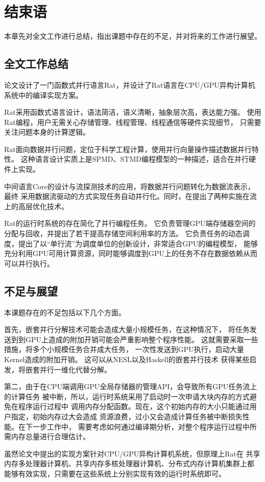 \chapter{结束语}
本章先对全文工作进行总结，指出课题中存在的不足，并对将来的工作进行展望。

\section{全文工作总结}
论文设计了一门函数式并行语言Rat，并设计了Rat语言在CPU/GPU异构计算机系统中的编译实现方案。

Rat采用函数式语言设计，语法简洁，语义清晰，抽象层次高，表达能力强。
使用Rat编程，用户无需关心存储管理、线程管理、线程通信等硬件实现细节，
只需要关注问题本身的计算逻辑。

Rat面向数据并行问题，定位于科学工程计算，使用并行向量操作描述数据并行特性。
这种语言设计实质上是SPMD、STMD编程模型的一种描述，适合在并行硬件上实现。

中间语言Core的设计与流探测技术的应用，将数据并行问题转化为数据流表示，最终
采用数据流驱动的方式实现任务自动并行化。同时，在提出了两种实施在流上的高层优化技术。

Rat的运行时系统的存在简化了并行编程任务。
它负责管理GPU端存储器空间的分配与回收，并提出了若干提高存储空间利用率的方法。
它负责任务的动态调度，提出了以“单行流”为调度单位的创新设计，非常适合GPU的编程模型，
能够充分利用GPU可用计算资源，同时能够调度到GPU上的任务不存在数据依赖从而可以并行执行。

\section{不足与展望}
本课题存在的不足包括以下几个方面。

首先，嵌套并行分解技术可能会造成大量小规模任务，在这种情况下，
将任务发送到到GPU上造成的附加开销可能会严重影响整个程序性能。
这就需要采取一些措施，将多个小规模任务合并成大任务，
一次性发送到GPU执行，启动大量Kernel造成的附加开销。
这可以从NESL以及Haskell的嵌套并行技术
获得某些启发，将嵌套并行一维化代替分解。

第二，由于在CPU端调用GPU全局存储器的管理API，会导致所有GPU任务流上的计算任务
被中断，所以，运行时系统采用了启动时一次申请大块内存的方式避免在程序运行过程中
调用内存分配函数。现在，这个初始内存的大小只能通过用户指定，初始内存过大会造成
资源浪费，过小又会造成计算任务被中断损失性能。在下一步工作中，
需要考虑如何通过编译期分析，对整个程序运行过程中所需内存总量进行合理估计。

虽然论文中提出的实现方案针对CPU/GPU异构计算机系统，但原理上Rat在
共享内存多处理器计算机、共享内存多核处理器计算机、分布式内存计算机集群上都
能够有效实现，只需要在这些系统上分别实现有效的运行时系统即可。
